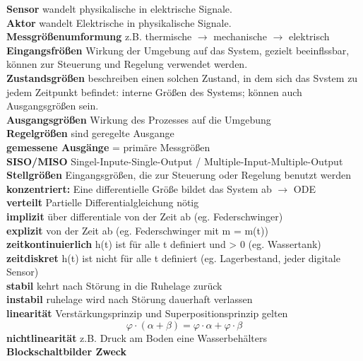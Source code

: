\documentclass{article}
\begin{document}
\begin{multicols}{6}
\textbf{Sensor} wandelt physikalische in elektrische Signale.
\\
\textbf{Aktor} wandelt Elektrische in physikalische Signale.
\\
\textbf{Messgrößenumformung} z.B. thermische $\rightarrow$ mechanische $\rightarrow$ elektrisch \\
\textbf{Eingangsfrößen} Wirkung der Umgebung auf das System, gezielt beeinflssbar, können zur Steuerung und Regelung verwendet werden. 
\\
\textbf{Zustandsgrößen} beschreiben einen solchen Zustand, in dem sich das Svstem zu jedem Zeitpunkt befindet: interne Größen des Systems; können auch Ausgangsgrößen sein.  
\\
\textbf{Ausgangsgrößen} Wirkung des Prozesses auf die  Umgebung 
\\
\textbf{Regelgrößen} sind geregelte Ausgange 
\\
\textbf{gemessene Ausgänge} = primäre Messgrößen 
\\
\textbf{SISO/MISO} Singel-Inpute-Single-Output / Multiple-Input-Multiple-Output 
\\
\textbf{Stellgrößen} Eingangsgrößen, die zur Steuerung oder Regelung benutzt werden
\\
\textbf{konzentriert:} Eine differentielle Größe bildet das System ab $\rightarrow$ ODE
\\
\textbf{verteilt} Partielle Differentialgleichung nötig
\\
\textbf{implizit} über differentiale von der Zeit ab (eg. Federschwinger)
\\
\textbf{explizit} von der Zeit ab (eg. Federschwinger mit m = m(t))
\\
\textbf{zeitkontinuierlich} h(t) ist für alle t definiert und > 0 (eg. Wassertank)
\\
\textbf{zeitdiskret} h(t) ist nicht für alle t definiert (eg. Lagerbestand, jeder digitale Sensor)
\\
\textbf{stabil} kehrt nach Störung in die Ruhelage zurück
\\
\textbf{instabil} ruhelage wird nach Störung dauerhaft verlassen
\\
\textbf{linearität} Verstärkungsprinzip und Superpositionsprinzip gelten 
\begin{equation*}
\varphi \cdot (\alpha + \beta) = \varphi \cdot \alpha + \varphi \cdot \beta
\end{equation*}
\textbf{nichtlinearität} z.B. Druck am Boden eine Wasserbehälters
\\
\textbf{Blockschaltbilder Zweck} 

\end{multicols}
\end{document}

